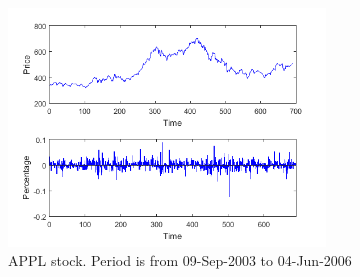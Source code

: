 \documentclass[11pt,a4,twosided,singlespacing,titlepagenumber=on]{scrreprt}
\numberwithin{equation}{chapter} %
\theoremstyle{remark}
\begin{document}
\begin{figure}[H]
\centering
\includegraphics[width = 0.75\textwidth]{apple_2003_2006}
\caption{APPL stock. Period is from 09-Sep-2003 to 04-Jun-2006}
\label{apple_2003_2006}
\end{figure}
\end{document}
